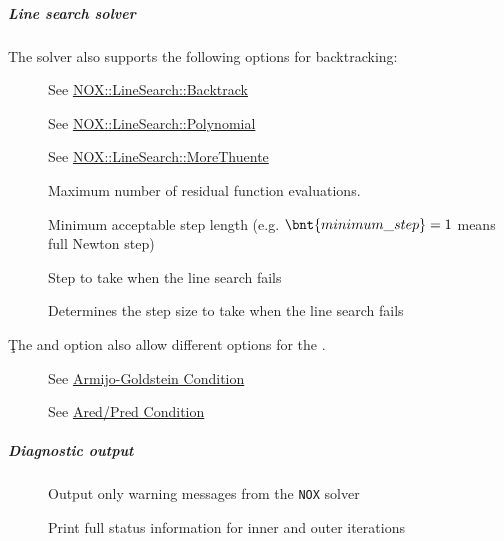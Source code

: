 \subparagraph{Line search solver}
The  solver also supports the following options for backtracking:
\begin{description}
\item[] See \href{https://docs.trilinos.org/latest-release/packages/nox/doc/html/classNOX_1_1LineSearch_1_1Backtrack.html}{NOX::LineSearch::Backtrack}
\item[] See \href{https://docs.trilinos.org/latest-release/packages/nox/doc/html/classNOX_1_1LineSearch_1_1Polynomial.html}{NOX::LineSearch::Polynomial}
\item[] See \href{https://docs.trilinos.org/latest-release/packages/nox/doc/html/classNOX_1_1LineSearch_1_1MoreThuente.html}{NOX::LineSearch::MoreThuente}
\end{description}
\begin{description}
\item[] Maximum number of residual function evaluations.
\item[] Minimum acceptable step length (e.g. $\bnt{minimum\_step} = 1$ means full Newton step)
\item[] Step to take when the line search fails
\item[] Determines the step size to take when the line search fails
\end{description}
Ţhe  and  option also allow different options for the .
\begin{description}
\item[] See \href{https://docs.trilinos.org/latest-release/packages/nox/doc/html/classNOX_1_1LineSearch_1_1MoreThuente.html}{Armijo-Goldstein Condition}
\item[] See \href{https://docs.trilinos.org/latest-release/packages/nox/doc/html/classNOX_1_1LineSearch_1_1MoreThuente.html}{Ared/Pred Condition}
\end{description}
\subparagraph{Diagnostic output}
\begin{description}
\item[] Output only warning messages from the \verb;NOX; solver
\item[] Print full status information for inner and outer iterations
\end{description}

